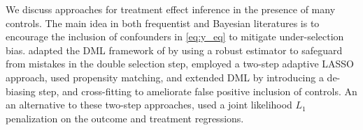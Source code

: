 \documentclass[12pt]{article}
\def\cred{\textcolor{red}}
\newcommand{\davidcom}[1]{{\color{red} [DR. #1]} }
\begin{document}
We discuss approaches for treatment effect inference in the presence of many controls.
The main idea in both frequentist and Bayesian literatures is to encourage the inclusion of confounders in \eqref{eq:y_eq} to mitigate under-selection bias. 
\cite{Farrell15} adapted the DML framework of \cite{Belloni14b} by using a robust estimator to safeguard from mistakes in the double selection step, 
\cite{Shortreed17} employed a two-step adaptive LASSO approach,
\cite{Antonelli18} used propensity matching,
and \cite{Victor18} extended DML by introducing a de-biasing step, and cross-fitting to ameliorate false positive inclusion of controls. 
An an alternative to these two-step approaches, \cite{Ertefaie15} used a joint likelihood $L_1$ penalization on the outcome and treatment regressions.
\end{document}
